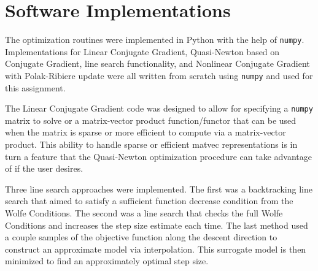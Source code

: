 \newpage
\appendix
\section{Software Implementations}
The optimization routines were implemented in Python with the help of \lstinline{numpy}. Implementations for Linear Conjugate Gradient, Quasi-Newton based on Conjugate Gradient, line search functionality, and Nonlinear Conjugate Gradient with Polak-Ribiere update were all written from scratch using \lstinline{numpy} and used for this assignment. 

The Linear Conjugate Gradient code was designed to allow for specifying a \lstinline{numpy} matrix to solve or a matrix-vector product function/functor that can be used when the matrix is sparse or more efficient to compute via a matrix-vector product. This ability to handle sparse or efficient matvec representations is in turn a feature that the Quasi-Newton optimization procedure can take advantage of if the user desires.

Three line search approaches were implemented. The first was a backtracking line search that aimed to satisfy a sufficient function decrease condition from the Wolfe Conditions. The second was a line search that checks the full Wolfe Conditions and increases the step size estimate each time. The last method used a couple samples of the objective function along the descent direction to construct an approximate model via interpolation. This surrogate model is then minimized to find an approximately optimal step size. 

